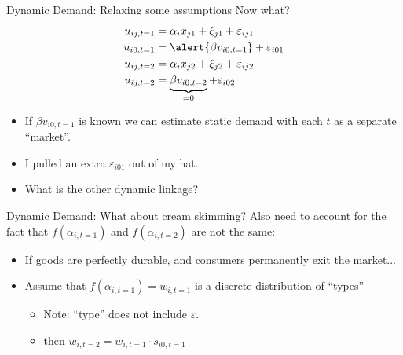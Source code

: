\begin{frame}{Dynamic Demand: Relaxing some assumptions}
Now what?
\begin{align*}
u_{ij,t=1} &=   \alpha_i x_{j1}  +  \xi_{j1} + \varepsilon_{ij1}\\
u_{i0,t=1} &=   \alert{\beta v_{i0,t=1}} + \varepsilon_{i01} \\
u_{ij,t=2} &=   \alpha_i x_{j2}  +  \xi_{j2} + \varepsilon_{ij2}\\
u_{ij,t=2} &=    \underbrace{\beta v_{i0,t=2} }_{=0}+ \varepsilon_{i02} 
\end{align*}
\begin{itemize}
\item If $\beta v_{i0,t=1}$ is known we can estimate static demand with each $t$ as a separate ``market''.
\item I pulled an extra $\varepsilon_{i01}$ out of my hat.
\item What is the other dynamic linkage?
\end{itemize}
\end{frame}


\begin{frame}{Dynamic Demand: What about cream skimming?}
Also need to account for the fact that $f(\alpha_{i,t=1})$ and $f(\alpha_{i,t=2})$  are not the same:
\begin{itemize}
\item If goods are perfectly durable, and consumers permanently exit the market...
\item Assume that $f(\alpha_{i,t=1}) = w_{i,t=1}$ is a discrete distribution of ``types''
\begin{itemize}
\item Note: ``type'' does not include $\varepsilon$.
\item then $w_{i,t=2} = w_{i,t=1} \cdot s_{i0,t=1}$
\end{itemize}
\end{itemize}
\end{frame}


